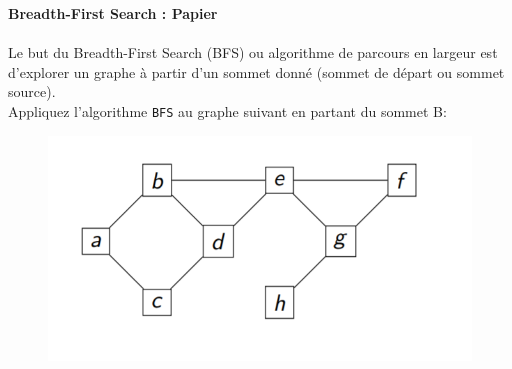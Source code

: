 \begin{Exercice}[10 minutes]\textbf{Breadth-First Search : Papier
}\\
\\
	Le but du Breadth-First Search (BFS) ou algorithme de parcours en largeur est d'explorer un graphe à partir d’un sommet donné (sommet de départ ou sommet source). \\

	Appliquez l’algorithme \lstinline{BFS} au graphe suivant en partant du sommet B:\\

	\begin{figure}[h!]
        		\centering
       	 	\includegraphics[]{resources/exerciceBFS.png}
	\end{figure}



\end{Exercice}
